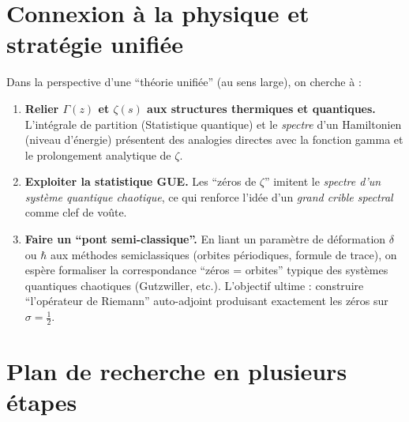 \documentclass[11pt]{article}
\begin{document}
\section{Connexion à la physique et stratégie unifiée}

Dans la perspective d'une “théorie unifiée” (au sens large), on cherche à :

\begin{enumerate}
  \item \textbf{Relier $\Gamma(z)$ et $\zeta(s)$ aux structures thermiques et quantiques.}
  L'intégrale de partition (Statistique quantique) et le \emph{spectre} d'un Hamiltonien (niveau d'énergie) présentent des analogies directes avec la fonction gamma et le prolongement analytique de $\zeta$.

  \item \textbf{Exploiter la statistique GUE.}
  Les “zéros de $\zeta$” imitent le \emph{spectre d'un système quantique chaotique}, ce qui renforce l'idée d'un \emph{grand crible spectral} comme clef de voûte. 

  \item \textbf{Faire un “pont semi-classique”.}
  En liant un paramètre de déformation \(\delta\) ou \(\hbar\) aux méthodes semiclassiques (orbites périodiques, formule de trace), on espère formaliser la correspondance “zéros = orbites” typique des systèmes quantiques chaotiques (Gutzwiller, etc.). L'objectif ultime : construire “l'opérateur de Riemann” auto-adjoint produisant exactement les zéros sur \(\sigma=\tfrac12\).
\end{enumerate}

\section{Plan de recherche en plusieurs étapes}
\end{document}
